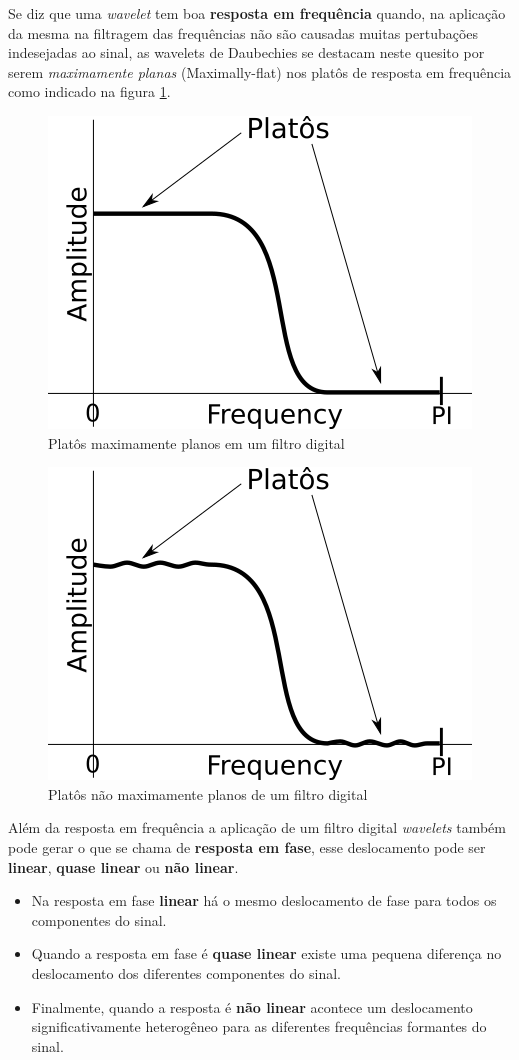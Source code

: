 \documentclass[a4paper,12pt,openright,oneside]{book}
\newenvironment{myenv}[1]
  {\begin{spacing}{#1}}
  {\end{spacing}}
\begin{document}
\begin{myenv}{1.5}
					\par Se diz que uma \textit{wavelet} tem boa \textbf{resposta em frequência} quando, na aplicação da mesma na filtragem das frequências não são causadas muitas pertubações indesejadas ao sinal, as wavelets de Daubechies se destacam neste quesito por serem \textit{maximamente planas} (Maximally-flat) nos platôs de resposta em frequência como indicado na figura \ref{fig:daubechies}.

					\begin{figure}[h]
						\centering
						\includegraphics[width=0.3\linewidth]{images/daubechies}
						\caption{Platôs maximamente planos em um filtro digital}
						\label{fig:daubechies}
					\end{figure}

					\begin{figure}[h]
						\centering
						\includegraphics[width=0.3\linewidth]{images/noMaximallyFlat}
						\caption{Platôs não maximamente planos de um filtro digital}
						\label{fig:nomaximallyflat}
					\end{figure}
				
					\par Além da resposta em frequência a aplicação de um filtro digital \textit{wavelets} também pode gerar o que se chama de \textbf{resposta em fase}, esse deslocamento pode ser \textbf{linear}, \textbf{quase linear} ou \textbf{não linear}. 
					
					\begin{itemize}
						\item Na resposta em fase \textbf{linear} há o mesmo deslocamento de fase para todos os componentes do sinal.
						\item Quando a resposta em fase é \textbf{quase linear} existe uma pequena diferença no deslocamento dos diferentes componentes do sinal.
						\item Finalmente, quando a resposta é \textbf{não linear} acontece um deslocamento significativamente heterogêneo para as diferentes frequências formantes do sinal.
 					\end{itemize}
					

\end{myenv}
\end{document}
